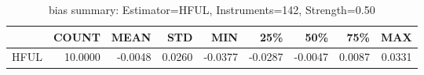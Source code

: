\begin{table}[ht]
\centering
\caption{bias summary: Estimator=HFUL, Instruments=142, Strength=0.50}
\begin{tabular}{lrrrrrrrr}
\toprule
 & COUNT & MEAN & STD & MIN & 25\% & 50\% & 75\% & MAX \\
\midrule
HFUL & 10.0000 & -0.0048 & 0.0260 & -0.0377 & -0.0287 & -0.0047 & 0.0087 & 0.0331 \\
\bottomrule
\end{tabular}
\end{table}
